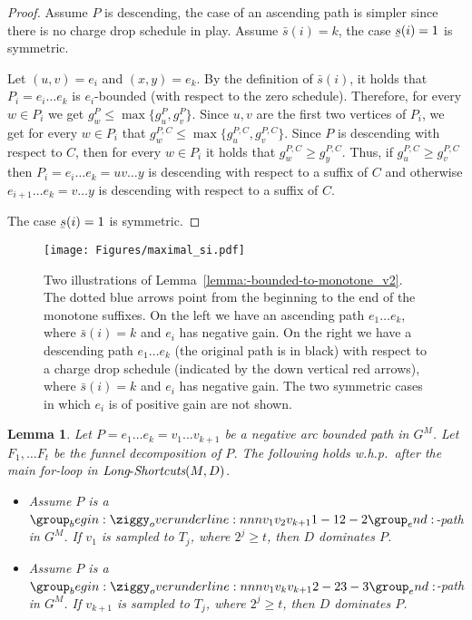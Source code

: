 \documentclass[11pt]{article}
\newtheorem{lemma}[theorem]{Lemma}
\newcommand{\ubar}[1]{\underaccent{\bar}{{#1}}}
\newcommand{\LS}{\mbox{{\it Long}-{\it Shortcuts}}}
\begin{document}
\begin{proof}
    Assume $P$ is descending, the case of an ascending path is simpler since there is no charge drop schedule in play.
    Assume $\bar{s}(i) = k$, the case $\ubar{{s}}(i)=1$ is symmetric. 
    
    Let $(u,v)=e_i$ and $(x,y) = e_{k}$. By the definition of $\bar{s}(i)$, it holds that $P_i=e_i \ldots e_{k}$ is $e_i$-bounded (with respect to the zero schedule).
    Therefore, for every $w\in P_i$ we get $ g^{P}_w \le \max \{g^P_u, g^P_v \}$. Since $u,v$ are the first two vertices of $P_i$, we get for every $w\in P_i$ that $g^{P,C}_w \le \max \{g^{P,C}_u, g^{P,C}_v \}$.
    Since $P$ is descending with respect to $C$, then for every $w\in P_i$ it holds that $g^{P,C}_w \ge g^{P,C}_y$. Thus, if $g^{P,C}_u \ge g^{P,C}_v$ then $P_i=e_i \ldots e_k = uv \ldots y$ is descending with respect to a suffix of $C$ and otherwise $e_{i+1}\ldots e_k = v\ldots y$ is descending with respect to a suffix of $C$.

    The case $\ubar{s}(i)=1$ is symmetric.
\end{proof}



\begin{figure}
    \centering
\texttt{[image: Figures/maximal\_si.pdf]}
\caption{Two illustrations of Lemma~\ref{lemma:-bounded-to-monotone_v2}. The dotted blue arrows point from the beginning to the end of the monotone suffixes. On the left we have an ascending path $e_1 \ldots e_k$, where $\bar{s}(i)=k$ and $e_i$ has negative gain. On the right we have a descending path $e_1\ldots e_k$ (the original path is in black) with respect to a charge drop schedule (indicated by the down vertical red arrows), where $\bar{s}(i)=k$ and $e_i$ has negative gain. The two symmetric cases in which $e_i$ is of positive gain are not shown.}
\label{fig:maximal_si}
\end{figure}


\begin{lemma}\label{lemma:funnel-bfs-length}
    Let $P=e_1 \ldots e_k = v_1\ldots v_{k+1}$ be a negative arc bounded path in $G^M$. Let $F_1, \ldots F_t$ be the funnel decomposition of $P$. The following holds w.h.p.\ after the main for-loop in $\LS(M,D)$.
    \begin{itemize}
        \item Assume $P$ is a $\overunderline{{v_1}{v_2}{v_{k+1}}}{1-1}{2-2}$-path in $G^M$. If $v_1$ is sampled to $T_j$, where $2^j\ge t$, then $D$ dominates $P$.
        \item Assume $P$ is a $\overunderline{{v_1}{v_{k}}{v_{k+1}}}{2-2}{3-3}$-path in $G^M$. If $v_{k+1}$ is sampled to $T_j$, where $2^j\ge t$, then $D$ dominates $P$.
    \end{itemize}
\end{lemma}
\end{document}
